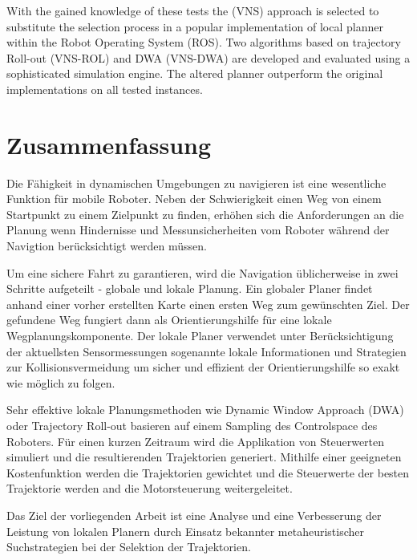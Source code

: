 With the gained knowledge of these tests the (VNS) approach is selected to substitute the selection process in a popular implementation of local planner within the Robot Operating System (ROS). 
Two algorithms based on trajectory Roll-out (VNS-ROL) and DWA (VNS-DWA) are developed and evaluated using a sophisticated simulation engine. 
The altered planner outperform the original implementations on all tested instances.
\vfill
\newpage

\chapter*{Zusammenfassung}
Die F\"ahigkeit in dynamischen Umgebungen zu navigieren ist eine wesentliche Funktion f\"ur mobile Roboter. Neben der Schwierigkeit einen Weg von einem Startpunkt zu einem Zielpunkt zu finden, erh\"ohen sich die Anforderungen an die Planung wenn Hindernisse und Messunsicherheiten vom Roboter w\"ahrend der Navigtion ber\"ucksichtigt werden m\"ussen. 

Um eine sichere Fahrt zu garantieren, wird die Navigation \"ublicherweise in zwei Schritte aufgeteilt - globale und lokale Planung. 
Ein globaler Planer findet anhand einer vorher erstellten Karte einen ersten Weg zum gew\"unschten Ziel. 
Der gefundene Weg fungiert dann als Orientierungshilfe f\"ur eine lokale Wegplanungskomponente. 
Der lokale Planer verwendet unter Ber\"ucksichtigung der aktuellsten Sensormessungen sogenannte lokale Informationen und Strategien zur Kollisionsvermeidung um sicher und effizient der Orientierungshilfe so exakt wie m\"oglich zu folgen. 

Sehr effektive lokale Planungsmethoden wie Dynamic Window Approach (DWA) oder Trajectory Roll-out basieren auf einem Sampling des Controlspace des Roboters. 
F\"ur einen kurzen Zeitraum wird die Applikation von Steuerwerten simuliert und die resultierenden Trajektorien generiert.  
Mithilfe einer geeigneten Kostenfunktion werden die Trajektorien gewichtet und die Steuerwerte der besten Trajektorie werden and die Motorsteuerung weitergeleitet.

Das Ziel der vorliegenden Arbeit ist eine Analyse und eine Verbesserung der Leistung von lokalen Planern durch Einsatz bekannter metaheuristischer Suchstrategien bei der Selektion der Trajektorien.

